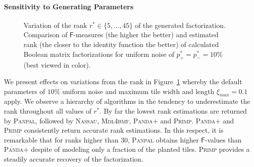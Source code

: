 \paragraph{Sensitivity to Generating Parameters}%
\begin{figure}
\centering

\caption{Variation of the rank $r^*\in\{5,\ldots,45\}$ of the generated factorization. Comparison of $\mathsf{F}$-measures (the higher the better) and estimated rank (the closer to the identity function the better) of calculated Boolean matrix factorizations for uniform noise of $p_+^*=p_-^*=10\%$ (best viewed in color).}
\label{fig:rank}
\end{figure}
We present effects on variations from the rank in Figure~\ref{fig:rank} whereby the default parameters of $10\%$ uniform noise and maximum tile width and length $\xi_{max}=0.1$ apply. We observe a hierarchy of algorithms in the tendency to underestimate the rank throughout all values of $r^*$. By far the lowest rank estimations are returned by \textsc{Panpal}, followed by \textsc{Nassau}, \textsc{Mdl4bmf}, \textsc{Panda+} and \textsc{Primp}. \textsc{Panda+} and \textsc{Primp} consistently return accurate rank estimations. In this respect, it is remarkable that for ranks higher than 30, \textsc{Panpal} obtains higher $\mathsf{F}$-values than \textsc{Panda+} despite of modeling only a fraction of the planted tiles. \textsc{Primp} provides a steadily accurate recovery of the factorization.

